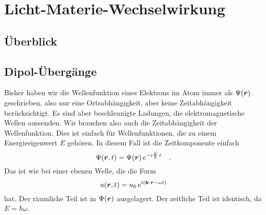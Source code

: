 \renewcommand{\lastmod}{22. November 2024}
\renewcommand{\chapterauthors}{Markus Lippitz}

\chapter{Licht-Materie-Wechselwirkung}





\section{Überblick}








\section{Dipol-Übergänge}

Bisher haben wir die Wellenfunktion eines Elektrons im Atom immer als $\Psi(\boldsymbol{r})$ geschrieben, also nur eine Ortsabhängigkeit, aber keine Zeitabhängigkeit berücksichtigt. Es sind aber beschleunigte Ladungen, die elektromagnetische Wellen aussenden. Wir brauchen also auch die Zeitabhängigkeit der Wellenfunktion. Dies ist einfach für Wellenfunktionen, die zu einem Energieeigenwert $E$ gehören. In diesem Fall ist die Zeitkomponente einfach 
\begin{equation}
    \Psi(\boldsymbol{r}, t) = \Psi(\boldsymbol{r}) \, e^{- i \frac{E}{\hbar} \, t} \quad .
\end{equation}
Das ist wie bei einer ebenen Welle, die die Form 
\begin{equation}
    u(\boldsymbol{r}, t) = u_0 \, e^{i ( \boldsymbol{k} \cdot \boldsymbol{r} - \omega t)}
\end{equation}
hat. Der räumliche Teil ist in $\Psi(\boldsymbol{r})$ ausgelagert. Der zeitliche Teil ist identisch, da $E = \hbar \omega$.

